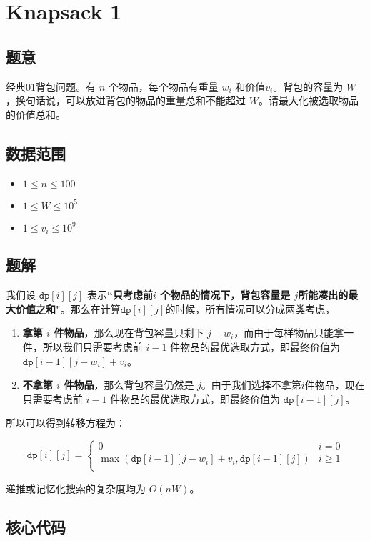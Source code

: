 \section{Knapsack 1}
\subsection*{题意}
经典01背包问题。有 $n$ 个物品，每个物品有重量 $w_i$ 和价值$v_i$。背包的容量为 $W$，换句话说，可以放进背包的物品的重量总和不能超过 $W$。请最大化被选取物品的价值总和。
\subsection*{数据范围}
\begin{itemize}
\item $1 \leq n \leq 100$
\item $1 \leq W \leq 10^5$
\item $1 \leq v_i \leq 10^9$
\end{itemize}
\subsection*{题解}

我们设 {${\texttt{dp}[i][j]}$} 表示\textbf{``只考虑前$i$ 个物品的情况下，背包容量是 $j$所能凑出的最大价值之和"}。那么在计算${\texttt{dp}[i][j]}$的时候，所有情况可以分成两类考虑，
\begin{enumerate}
    \item \textbf{拿第 $i$ 件物品}，那么现在背包容量只剩下 $j - w_i$，而由于每样物品只能拿一件，所以我们只需要考虑前 $i-1$ 件物品的最优选取方式，即最终价值为 $\texttt{dp}[i-1][j-w_i] + v_i$。
    \item \textbf{不拿第 $i$ 件物品}，那么背包容量仍然是 $j$。由于我们选择不拿第$i$件物品，现在只需要考虑前 $i-1$ 件物品的最优选取方式，即最终价值为 ${\texttt{dp}[i-1][j]}$。
\end{enumerate}

所以可以得到转移方程为：

\begin{equation*}
{\texttt{dp}[i][j]} = 
\begin{cases}
 0 & i = 0\\
\max({\texttt{dp}}[i-1][j-w_i] + v_i,{\texttt{dp}}[i-1][j]) & i \ge 1\\
\end{cases}
\end{equation*}

递推或记忆化搜索的复杂度均为 $O(nW)$。


\subsection*{核心代码}
\inputminted[linenos,autogobble]{cpp}{./Code/D.cpp}
\newpage